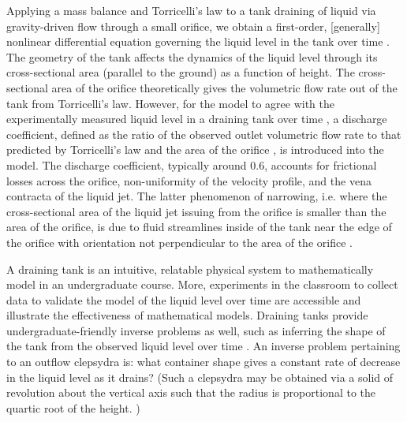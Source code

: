 \documentclass[openacc]{rsproca_new}%
\begin{document}
Applying a mass balance and Torricelli's law to a tank draining of liquid via gravity-driven flow through a small orifice, we obtain a first-order, [generally] nonlinear differential equation governing the liquid level in the tank over time \cite{groetsch1993inverse,seborg2016process,debook}.
The geometry of the tank affects the dynamics of the liquid level through its cross-sectional area (parallel to the ground) as a function of height.
The cross-sectional area of the orifice theoretically gives the volumetric flow rate out of the tank from Torricelli's law. 
However, for the model to agree with the experimentally measured liquid level in a draining tank over time \cite{de2000pin,blasone2015discharge,wadhwa2021study,liu2008drainage}, a discharge coefficient, defined as the ratio of the observed outlet volumetric flow rate to that predicted by Torricelli's law and the area of the orifice \cite{hicks2014determining}, is introduced into the model. 
The discharge coefficient, typically around 0.6,
accounts for frictional losses across the orifice, non-uniformity of the velocity profile, and the vena contracta of the liquid jet.
The latter phenomenon of narrowing, i.e. where the cross-sectional area of the liquid jet issuing from the orifice is smaller than the area of the orifice, is due to fluid streamlines inside of the tank near the edge of the orifice with orientation not perpendicular to the area of the orifice \cite{horsch2020simple}. 
\cite{teoman2022discharge,hicks2014determining,blasone2015discharge,lienhard1984velocity,wadhwa2021study}


A draining tank is an intuitive, relatable physical system to mathematically model in an undergraduate course. 
More, experiments in the classroom to collect data to validate the model of the liquid level over time are accessible and illustrate the effectiveness of mathematical models.
\cite{farmer1992physical,driver1998torricelli,brady2009siphons,rother2024modelling,paldy1963apparatus,ivanov2014testing,williams2021vessel,pavesi2019investigating,planinvsivc2011holes,saleta2005experimental,lopac2015water,powell2012carrying}
Draining tanks provide undergraduate-friendly inverse problems \cite{groetsch1993inverse,neto2012introduction,tarantola2005inverse} as well, such as inferring the shape of the tank from the observed liquid level over time \cite{groetsch1993inverse,groetsch1999inverse}. 
An inverse problem pertaining to an outflow clepsydra is: what container shape gives a constant rate of decrease in the liquid level as it drains?
(Such a clepsydra may be obtained via a solid of revolution about the vertical axis such that the radius is proportional to the quartic root of the height. \cite{mills1982newton,d2021torricelli})
\end{document}
